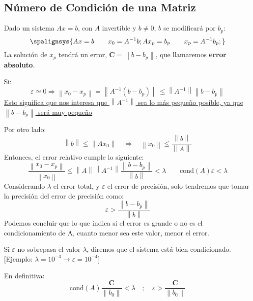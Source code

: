 \subsection{Número de Condición de una Matriz}
Dado un sistema \(Ax=b\), con \(A\) invertible y \(b \neq 0\), \(b\) se modificará por \(b_p\):
\[
        \spalignsys{
                Ax = b \hspace{2em} x_0 = A^{-1}b;
                Ax_p = b_p \hspace{2em} x_p = A^{-1}b_p;
        }
\]
La solución de \(x_p\) tendrá un error, \(\mathbf{C} = \left \| b - b_p \right \|\), que llamaremos \textbf{error absoluto}. \par Si:
\[\varepsilon \simeq 0 \Rightarrow  \left \| x_0 - x_p \right \| = \left \| A^{-1} \left ( b -b_p \right )\right \| \leq \left \| A^{-1} \right \| \left \| b - b_p \right \|\]
\underline{Esto significa que nos interesa que \(\left \| A^{-1} \right \|\) sea lo más pequeño posible, ya que \(\left \| b - b_p \right \|\) será muy pequeño}
\par \vspace{1em}
Por otro lado:
\[
        \left \| b \right \| \leq \left \| A x_0 \right \| \hspace{1em} \Rightarrow \hspace{1em} \left \| x_0 \right \| \leq \frac{\left \| b \right \|}{\left \| A \right \|}
\]
Entonces, el error relativo cumple lo siguiente:
\[
        \boxed{\frac{\left \| x_0 - x_p \right \|}{\left \| x_0 \right \|}\leq \left \| A \right \|\left \| A ^{-1} \right \| \frac{\left \| b - b_p \right \|}{\left \| b \right \|} < \lambda} \hspace{2em} \boxed{\text{cond}\left ( A \right )\varepsilon < \lambda}
\]
Considerando \(\lambda\) el error total, y \(\varepsilon\) el error de precisión, solo tendremos que tomar la precisión del error de precisión como:
\[
        \varepsilon > \frac{\left \|  b - b_p\right \|}{\left \| b \right \|}
\]
Podemos concluir que lo que indica si el error es grande o no es el condicionamiento de A, cuanto menor sea este valor, menor el error.
\par Si \(\varepsilon\) no sobrepasa el valor \(\lambda\), diremos que el sistema está bien condicionado.[Ejemplo: \(\lambda = 10^{-3} \rightarrow \varepsilon = 10^{-4}\)]
\par En definitiva:
\[
        \text{cond}(A)\frac{\mathbf{C}}{\left \| b_0 \right \|} < \lambda \hspace{1em}  ; \hspace{1em} \varepsilon > \frac{\mathbf{C}}{\left \| b_0 \right \|}
\]
